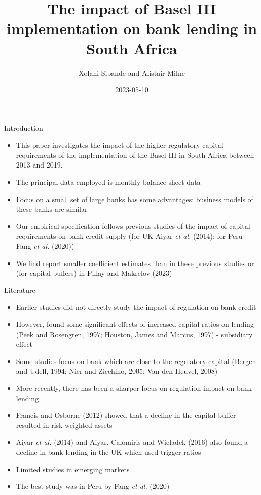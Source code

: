 \documentclass[
  14,
  ignorenonframetext,
  aspectratio=141,
]{beamer}
\title{The impact of Basel III implementation on bank lending in South
Africa}
\author{Xolani Sibande and Alistair Milne}
\date{2023-05-10}
\institute{South African Reserve Bank}
\providecommand{\tightlist}{%
  \setlength{\itemsep}{0pt}\setlength{\parskip}{0pt}}
\begin{document}
\frame{\titlepage}

\begin{frame}{Introduction}
\protect\hypertarget{introduction}{}
\begin{itemize}
\tightlist
\item
  This paper investigates the impact of the higher regulatory capital
  requirements of the implementation of the Basel III in South Africa
  between 2013 and 2019.
\item
  The principal data employed is monthly balance sheet data
\item
  Focus on a small set of large banks has some advantages: business
  models of these banks are similar
\item
  Our empirical specification follows previous studies of the impact of
  capital requirements on bank credit supply (for UK Aiyar \emph{et al.}
  (2014); for Peru Fang \emph{et al.} (2020))
\item
  We find report smaller coefficient estimates than in these previous
  studies or (for capital buffers) in Pillay and Makrelov (2023)
\end{itemize}
\end{frame}

\begin{frame}{Literature}
\protect\hypertarget{literature}{}
\begin{itemize}
\tightlist
\item
  Earlier studies did not directly study the impact of regulation on
  bank credit
\item
  However, found some significant effects of increased capital ratios on
  lending (Peek and Rosengren, 1997; Houston, James and Marcus, 1997) -
  subsidiary effect
\item
  Some studies focus on bank which are close to the regulatory capital
  (Berger and Udell, 1994; Nier and Zicchino, 2005; Van den Heuvel,
  2008)
\item
  More recently, there has been a sharper focus on regulation impact on
  bank lending
\item
  Francis and Osborne (2012) showed that a decline in the capital buffer
  resulted in risk weighted assets
\item
  Aiyar \emph{et al.} (2014) and Aiyar, Calomiris and Wieladek (2016)
  also found a decline in bank lending in the UK which used trigger
  ratios
\item
  Limited studies in emerging markets
\item
  The best study was in Peru by Fang \emph{et al.} (2020)
\end{itemize}
\end{frame}
\end{document}
